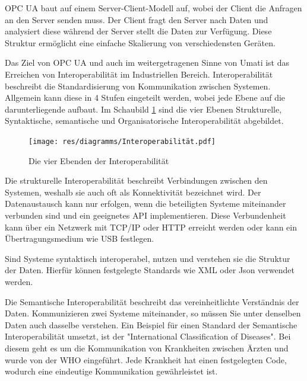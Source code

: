 \documentclass[a4paper, 12pt, oneside]{scrbook}
\begin{document}
	 OPC UA baut auf einem Server-Client-Modell auf, wobei der Client die Anfragen an den Server senden muss. Der Client fragt den Server nach Daten und analysiert diese während der Server stellt die Daten zur Verfügung. Diese Struktur ermöglicht eine einfache Skalierung von verschiedensten Geräten. 
	 
	 
	 
	 Das Ziel von OPC UA und auch im weitergetragenen Sinne von Umati ist das Erreichen von Interoperabilität im Industriellen Bereich. Interoperabilität beschreibt die Standardisierung von Kommunikation zwischen Systemen. Allgemein kann diese in 4 Stufen eingeteilt werden, wobei jede Ebene auf die darunterliegende aufbaut. Im Schaubild \ref{fig:Interoperabilität} sind die vier Ebenen Strukturelle, Syntaktische, semantische und Organisatorische Interoperabilität abgebildet.
	 
	 \begin{figure}[H]
	 	\centering
	 	\texttt{[image: res/diagramms/Interoperabilität.pdf]}
	 	\caption{Die vier Ebenden der Interoperabilität}
	 	\label{fig:Interoperabilität}
	 \end{figure}
	 
	 Die strukturelle Interoperabilität beschreibt Verbindungen zwischen den Systemen, weshalb sie auch oft als Konnektivität bezeichnet wird. Der Datenaustausch kann nur erfolgen, wenn die beteiligten Systeme miteinander verbunden sind und ein geeignetes \ac{API} implementieren. Diese Verbundenheit kann über ein Netzwerk mit TCP/IP oder HTTP erreicht werden oder kann ein Übertragungsmedium wie USB festlegen. \cite{mielebacher_verteilte_2021}
	 
	 Sind Systeme syntaktisch interoperabel, nutzen und verstehen sie die Struktur der Daten. Hierfür können festgelegte Standards wie XML oder Json verwendet werden. \cite{mielebacher_verteilte_2021-1}
	 
	 Die Semantische Interoperabilität beschreibt das vereinheitlichte Verständnis der Daten. Kommunizieren zwei Systeme miteinander, so müssen Sie unter denselben Daten auch dasselbe verstehen. Ein Beispiel für einen Standard der Semantische Interoperabilität umsetzt, ist der "International Classification of Diseases". Bei diesem geht es um die Kommunikation von Krankheiten zwischen Ärzten und wurde von der WHO eingeführt. Jede Krankheit hat einen festgelegten Code, wodurch eine eindeutige Kommunikation gewährleistet ist. \cite{mielebacher_verteilte_2021-1}
	 
\end{document}
